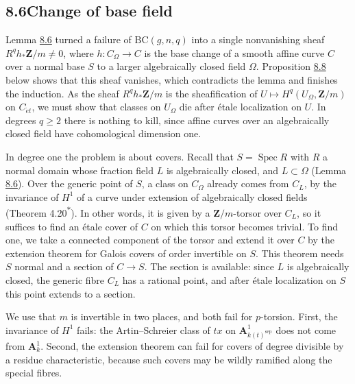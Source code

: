 \documentclass[11pt]{article}
\newcommand{\bpout}[1]{#1\textsuperscript{\hyperlink{bp-outside}{\ensuremath{\ast}}}}
\begin{document}
\subsection*{\texorpdfstring{8.6\quad Change of base field}{8.6 Change of base field}}
\label{bp30}%
\label{bp31}%
Lemma \hyperref[bp26]{8.6} turned a failure of \(\mathrm{BC}(g,n,q)\) into a single nonvanishing sheaf \(R^qh_*\mathbf Z/m\ne0\), where \(h:C_\Omega\to C\) is the base change of a smooth affine curve \(C\) over a normal base \(S\) to a larger algebraically closed field \(\Omega\). Proposition \hyperref[bp32]{8.8} below shows that this sheaf vanishes, which contradicts the lemma and finishes the induction. As the sheaf \(R^qh_*\mathbf Z/m\) is the sheafification of \(U\mapsto H^q(U_\Omega,\mathbf Z/m)\) on \(C_{\acute{e}t}\), we must show that classes on \(U_\Omega\) die after étale localization on \(U\). In degrees \(q\geq2\) there is nothing to kill, since affine curves over an algebraically closed field have cohomological dimension one.

In degree one the problem is about covers. Recall that \(S=\operatorname{Spec}R\) with \(R\) a normal domain whose fraction field \(L\) is algebraically closed, and \(L\subset\Omega\) (Lemma \hyperref[bp26]{8.6}). Over the generic point of \(S\), a class on \(C_\Omega\) already comes from \(C_L\), by the invariance of \(H^1\) of a curve under extension of algebraically closed fields (Theorem \bpout{4.20}). In other words, it is given by a \(\mathbf Z/m\)-torsor over \(C_L\), so it suffices to find an étale cover of \(C\) on which this torsor becomes trivial. To find one, we take a connected component of the torsor and extend it over \(C\) by the extension theorem for Galois covers of order invertible on \(S\). This theorem needs \(S\) normal and a section of \(C\to S\). The section is available: since \(L\) is algebraically closed, the generic fibre \(C_L\) has a rational point, and after étale localization on \(S\) this point extends to a section.

We use that \(m\) is invertible in two places, and both fail for \(p\)-torsion. First, the invariance of \(H^1\) fails: the Artin–Schreier class of \(tx\) on \(\mathbf A^1_{k(t)^{\mathrm{sep}}}\) does not come from \(\mathbf A^1_k\). Second, the extension theorem can fail for covers of degree divisible by a residue characteristic, because such covers may be wildly ramified along the special fibres.
\end{document}
